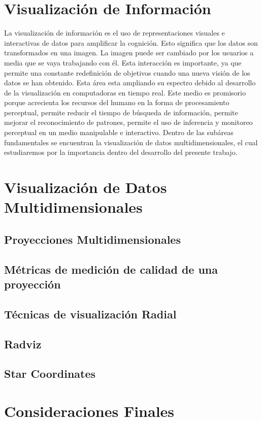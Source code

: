 \section{Visualización de Información}
La visualización de información \cite{card1999readings} es el uso de representaciones visuales e interactivas de datos para amplificar la cognición. Esto significa que los datos son transformados en una imagen. La imagen puede ser cambiado por los usuarios a media que se vaya trabajando con él. Esta interacción es importante, ya que permite una constante redefinición de objetivos cuando una nueva visión de los datos se han obtenido.
Esta área esta ampliando su espectro debido al desarrollo de la visualización en computadoras en tiempo real. Este medio es promisorio porque acrecienta los recursos del humano en la forma de procesamiento perceptual, permite reducir el tiempo de búsqueda de información, permite mejorar el reconocimiento de patrones, permite el uso de  inferencia y monitoreo perceptual en un medio manipulable e interactivo.
Dentro de las subáreas fundamentales se encuentran la visualización de datos multidimensionales, el cual estudiaremos por la importancia dentro del desarrollo del presente trabajo.
\section{Visualización de Datos Multidimensionales}
		\subsection{Proyecciones Multidimensionales}
		\subsection{Métricas de medición de calidad de una proyección}
		\subsection{Técnicas de visualización Radial}
		\subsection{Radviz}
		\subsection{Star Coordinates}
\section{Consideraciones Finales}
